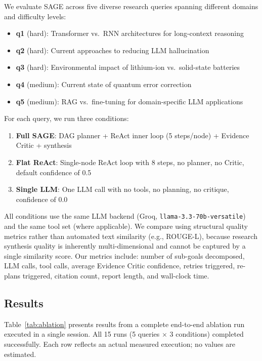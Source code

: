 \documentclass[11pt]{article}
\begin{document}
We evaluate SAGE across five diverse research queries spanning different domains and difficulty levels:

\begin{itemize}[leftmargin=1.5em, itemsep=2pt]
  \item \textbf{q1} (hard): Transformer vs.\ RNN architectures for long-context reasoning
  \item \textbf{q2} (hard): Current approaches to reducing LLM hallucination
  \item \textbf{q3} (hard): Environmental impact of lithium-ion vs.\ solid-state batteries
  \item \textbf{q4} (medium): Current state of quantum error correction
  \item \textbf{q5} (medium): RAG vs.\ fine-tuning for domain-specific LLM applications
\end{itemize}

For each query, we run three conditions:

\begin{enumerate}[leftmargin=1.5em, itemsep=2pt]
  \item \textbf{Full SAGE}: DAG planner + ReAct inner loop (5 steps/node) + Evidence Critic + synthesis
  \item \textbf{Flat ReAct}: Single-node ReAct loop with 8 steps, no planner, no Critic, default confidence of 0.5
  \item \textbf{Single LLM}: One LLM call with no tools, no planning, no critique, confidence of 0.0
\end{enumerate}

All conditions use the same LLM backend (Groq, \texttt{llama-3.3-70b-versatile}) and the same tool set (where applicable). We compare using structural quality metrics rather than automated text similarity (e.g., ROUGE-L), because research synthesis quality is inherently multi-dimensional and cannot be captured by a single similarity score. Our metrics include: number of sub-goals decomposed, LLM calls, tool calls, average Evidence Critic confidence, retries triggered, re-plans triggered, citation count, report length, and wall-clock time.

\subsection{Results}

Table~\ref{tab:ablation} presents results from a complete end-to-end ablation run executed in a single session. All 15 runs (5 queries $\times$ 3 conditions) completed successfully. Each row reflects an actual measured execution; no values are estimated.
\end{document}
